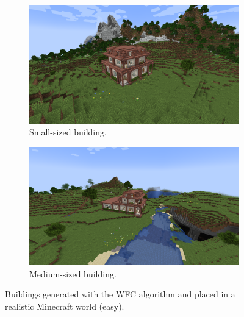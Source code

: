 \documentclass[
oneside,
fontsize=11pt
]{scrartcl}
\begin{document}
\begin{figure}[ht]
  \centering
  \begin{subfigure}[t]{0.48\textwidth}
    \includegraphics[width=\textwidth]{images/end2end/generated_small_building.png}
    \caption{Small-sized building.}
  \end{subfigure}
  \hfill
  \begin{subfigure}[t]{0.48\textwidth}
    \includegraphics[width=\textwidth]{images/end2end/generated_medium_building.png}
    \caption{Medium-sized building.}
  \end{subfigure}
  \caption{Buildings generated with the WFC algorithm and placed in a realistic Minecraft world (easy).}
  \label{fig_generated_medium_building_real_world}
\end{figure}
\end{document}
